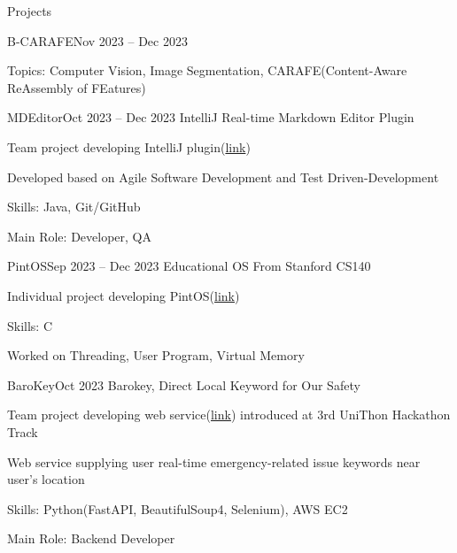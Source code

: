 \documentclass{resume}
\begin{document}
\begin{rSection}{Projects}
\begin{rSubsection}{B-CARAFE}{Nov 2023 -- Dec 2023}
        \item Topics: Computer Vision, Image Segmentation, CARAFE(Content-Aware ReAssembly of FEatures)
    \end{rSubsection}

    \begin{rSubsection}{MDEditor}{Oct 2023 -- Dec 2023}
        IntelliJ Real-time Markdown Editor Plugin

        \item Team project developing IntelliJ plugin(\href{https://github.com/minsusun/csed332-project}{link})

        \item Developed based on Agile Software Development and Test Driven-Development

        \item Skills: Java, Git/GitHub

        \item Main Role: Developer, QA
    \end{rSubsection}

    \begin{rSubsection}{PintOS}{Sep 2023 -- Dec 2023}
        Educational OS From Stanford CS140

        \item Individual project developing PintOS(\href{https://github.com/minsusun/csed312-pintos}{link})

        \item Skills: C

        \item Worked on Threading, User Program, Virtual Memory
    \end{rSubsection}

    \begin{rSubsection}{BaroKey}{Oct 2023}
        Barokey, Direct Local Keyword for Our Safety

        \item Team project developing web service(\href{https://github.com/UniD3-Hackathon-Team4/barokey}{link}) introduced at 3rd UniThon Hackathon Track

        \item Web service supplying user real-time emergency-related issue keywords near user's location

        \item Skills: Python(FastAPI, BeautifulSoup4, Selenium), AWS EC2

        \item Main Role: Backend Developer
    \end{rSubsection}


\end{rSection}
\end{document}
